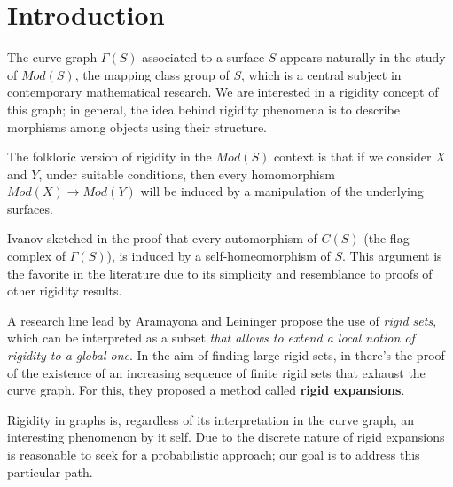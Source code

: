 \chapter*{Introduction} %

\label{Intro} %



The curve graph $\Gamma(S)$ associated to a surface $S$ appears naturally in the study of $Mod(S)$, the mapping class group of $S$, which is a central subject in contemporary mathematical research. We are interested in a rigidity concept of this graph; in general, the idea behind rigidity phenomena is to describe morphisms among objects using their structure.

The folkloric version of rigidity in the $Mod(S)$ context is that if we consider $X$ and $Y$, under suitable conditions, then every homomorphism $Mod(X) \to Mod(Y)$ will be induced by a manipulation of the underlying surfaces.

Ivanov sketched in \cite[Ivanov 97]{celebratedIvanov} the proof that every automorphism of $C(S)$ (the flag complex of $\Gamma(S)$), is induced by a self-homeomorphism of $S$. This argument is the favorite in the literature due to its simplicity and resemblance to proofs of other rigidity results.

A research line lead by Aramayona and Leininger propose the use of \textit{rigid sets}, which can be interpreted as a subset \textit{that allows to extend a local notion of rigidity to a global one}. In the aim of finding large rigid sets, in \cite[Aramayona, Leininger 16]{finiteRigidSetsJA} there's the proof of the existence of an increasing sequence of finite rigid sets that exhaust the curve graph. For this, they proposed a method called \textbf{rigid expansions}.

Rigidity in graphs is, regardless of its interpretation in the curve graph, an interesting phenomenon by it self. Due to the discrete nature of rigid expansions is reasonable to seek for a probabilistic approach; our goal is to address this particular path.

